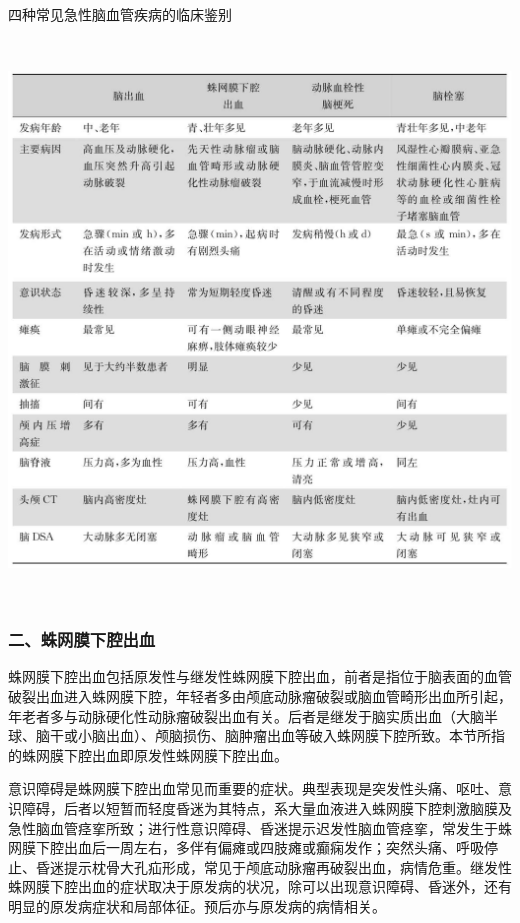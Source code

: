 \begin{table}[htbp]
\centering
\caption{四种常见急性脑血管疾病的临床鉴别}
\label{tab49-4}
\includegraphics[width=5.9375in,height=5.85417in]{./images/Image00310.jpg}
\end{table}

\subsubsection{二、蛛网膜下腔出血}

蛛网膜下腔出血包括原发性与继发性蛛网膜下腔出血，前者是指位于脑表面的血管破裂出血进入蛛网膜下腔，年轻者多由颅底动脉瘤破裂或脑血管畸形出血所引起，年老者多与动脉硬化性动脉瘤破裂出血有关。后者是继发于脑实质出血（大脑半球、脑干或小脑出血）、颅脑损伤、脑肿瘤出血等破入蛛网膜下腔所致。本节所指的蛛网膜下腔出血即原发性蛛网膜下腔出血。

意识障碍是蛛网膜下腔出血常见而重要的症状。典型表现是突发性头痛、呕吐、意识障碍，后者以短暂而轻度昏迷为其特点，系大量血液进入蛛网膜下腔刺激脑膜及急性脑血管痉挛所致；进行性意识障碍、昏迷提示迟发性脑血管痉挛，常发生于蛛网膜下腔出血后一周左右，多伴有偏瘫或四肢瘫或癫痫发作；突然头痛、呼吸停止、昏迷提示枕骨大孔疝形成，常见于颅底动脉瘤再破裂出血，病情危重。继发性蛛网膜下腔出血的症状取决于原发病的状况，除可以出现意识障碍、昏迷外，还有明显的原发病症状和局部体征。预后亦与原发病的病情相关。

